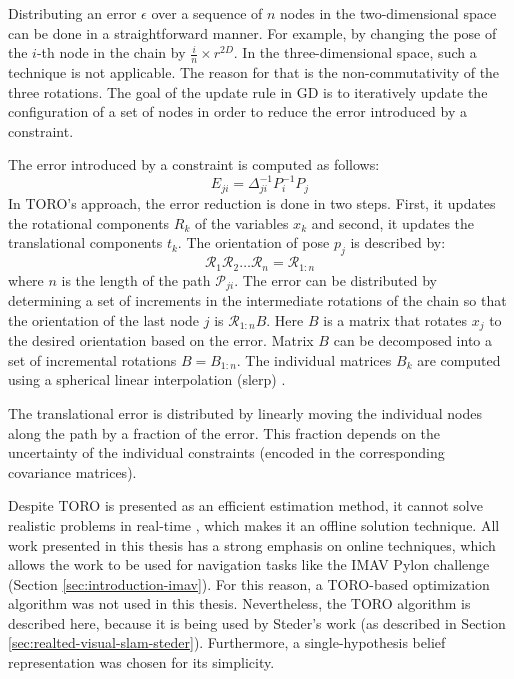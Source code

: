 Distributing an error $\epsilon$ over a sequence of $n$ nodes in the two-dimensional space can be done in a straightforward manner.
For example, by changing the pose of the $i$-th node in the chain by $\frac{i}{n} \times r^{2D}$.
In the three-dimensional space, such a technique is not applicable.
The reason for that is the non-commutativity of the three rotations.
The goal of the update rule in GD is to iteratively update the configuration of a set of nodes in order to reduce the error introduced by a constraint.

The error introduced by a constraint is computed as follows:
\begin{equation}
E_{ji} = \Delta_{ji}^{-1} P_i^{-1} P_j
\end{equation}
In TORO's approach, the error reduction is done in two steps.
First, it updates the rotational components $R_k$ of the variables $x_k$ and second, it updates the translational components $t_k$.
The orientation of pose $p_j$ is described by:
\begin{equation}
\mathcal{R}_1\mathcal{R}_2 \hdots \mathcal{R}_n = \mathcal{R}_{1:n}
\end{equation}
where $n$ is the length of the path $\mathcal{P}_{ji}$.
The error can be distributed by determining a set of increments in the intermediate rotations of the chain so that the orientation of the last node $j$ is $\mathcal{R}_{1:n} B$. Here $B$ is a matrix that rotates $x_j$ to the desired orientation based on the error.
Matrix $B$ can be decomposed into a set of incremental rotations $B = B_{1:n}$.
The individual matrices $B_k$ are computed using a spherical linear interpolation (slerp) \cite{barrera2004incremental}.

The translational error is distributed by linearly moving the individual nodes along the path by a fraction of the error.
This fraction depends on the uncertainty of the individual constraints (encoded in the corresponding covariance matrices).

Despite TORO is presented as an efficient estimation method, it cannot solve realistic problems in real-time \cite{grisetti2007efficient}, which makes it an offline solution technique.
All work presented in this thesis has a strong emphasis on online techniques, which allows the work to be used for navigation tasks like the IMAV Pylon challenge (Section \ref{sec:introduction-imav}).
For this reason, a TORO-based optimization algorithm was not used in this thesis.
Nevertheless, the TORO algorithm is described here, because it is being used by Steder's work (as described in Section \ref{sec:realted-visual-slam-steder}).
Furthermore, a single-hypothesis belief representation was chosen for its simplicity.


